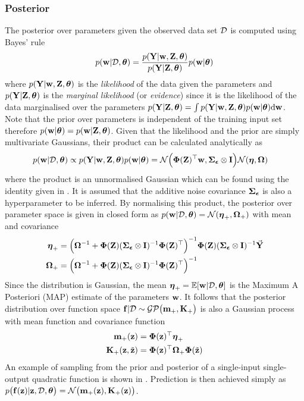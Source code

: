 



\subsubsection{Posterior}
The posterior over parameters given the observed data set $\cD$ is computed using Bayes' rule
\begin{equation}
p(\bw|\cD,\hyp) = \frac{p(\bY|\bw,\bZ,\hyp)}{p(\bY|\bZ,\hyp)} p(\bw|\hyp)
\end{equation}
where $p(\bY|\bw,\bZ,\hyp)$ is the \textit{likelihood} of the data given the parameters and $p(\bY|\bZ,\hyp)$ is the \textit{marginal likelihood} (or \textit{evidence}) since it is the likelihood of the data marginalised over the parameters $ p(\bY|\bZ,\hyp) = \int p(\bY|\bw,\bZ,\hyp) p(\bw|\hyp) \dd\bw$. Note that the prior over parameters is independent of the training input set therefore $p(\bw|\hyp) = p(\bw|\bZ,\hyp)$.
%
Given that the likelihood and the prior are simply multivariate Gaussians, their product can be calculated analytically as
\begin{align}
p(\bw|\cD,\hyp) &\propto  p(\bY|\bw,\bZ,\hyp) p(\bw|\hyp) 
= \cN\Big( \bPh(\bZ)\T \bw, \bS_{\be}\otimes\bI \Big)  \cN(\bet,\bOm)
\end{align}
where the product is an unnormalised Gaussian which can be found using the identity given in . It is assumed that the additive noise covariance $\bS_{\be}$ is also a hyperparameter to be inferred. By normalising this product, the posterior over parameter space is given in closed form as $p(\bw|\cD,\hyp) = \cN(\bet_+, \bOm_+)$ with mean and covariance
\begin{align}
\bet_+ &= \Big( \bOm^{-1} + \bPh(\bZ)( \bS_{\be}\otimes\bI)^{-1}\bPh(\bZ)\T \Big)^{-1}\bPh(\bZ)( \bS_{\be}\otimes\bI)^{-1}\vec\bY \label{eqn:parampostM}\\
\bOm_+ &= \Big( \bOm^{-1} + \bPh(\bZ)( \bS_{\be}\otimes\bI)^{-1}\bPh(\bZ)\T \Big)^{-1} \label{eqn:parampostV}
\end{align}
Since the distribution is Gaussian, the mean $\bet_+ = \EE[\bw|\cD,\hyp]$ is the Maximum A Posteriori (MAP) estimate of the parameters $\bw$.  It follows that the posterior distribution over function space $\bff|\cD \sim \mathcal{GP}\big(\bmm_+, \bK_+\big)$ is also a Gaussian process with mean function and covariance function
\begin{align}
\bmm_+(\bz) &= \bPh(\bz)\T\bet_+ \label{eqn:rbfM} \\
\bK_+(\bz,\tilde\bz) &= \bPh(\bz)\T \bOm_+ \bPh(\tilde\bz) \label{eqn:rbfV}
\end{align}
An example of sampling from the prior and posterior of a single-input single-output quadratic function is shown in . Prediction is then achieved simply as $p\big(\bff(\bz)|\bz,\cD,\hyp\big) = \cN\big(\bmm_+(\bz), \bK_+(\bz) \big)$.

